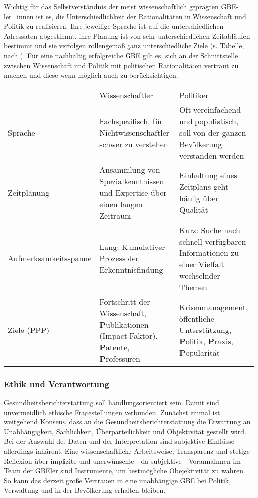 \documentclass{article}
\begin{document}
Wichtig für das Selbstverständnis der meist wissenschaftlich geprägten GBE-ler\_innen ist es, die Unterschiedlichkeit der Rationalitäten in Wissenschaft und Politik zu realisieren. Ihre jeweilige Sprache ist auf die unterschiedlichen Adressaten abgestimmt, ihre Planung ist von sehr unterschiedlichen Zeitabläufen bestimmt und sie verfolgen rollengemäß ganz unterschiedliche Ziele (s. Tabelle, nach \autocite{Kurth2006}). Für eine nachhaltig erfolgreiche GBE gilt es, sich an der Schnittstelle zwischen Wissenschaft und Politik mit politischen Rationalitäten vertraut zu machen und diese wenn möglich auch zu berücksichtigen.


\begin{tabu} to \textwidth { |X|X|X| }
\hline



 & Wissenschaftler & Politiker
 \\


Sprache & Fachspezifisch, für Nichtwissenschaftler schwer zu verstehen


 & Oft vereinfachend und populistisch, soll von der ganzen Bevölkerung verstanden werden
 \\


Zeitplanung & Ansammlung von Spezialkenntnissen und Expertise über einen langen Zeitraum & Einhaltung eines Zeitplans geht häufig über Qualität
 \\


Aufmerksamkeitsspanne & Lang: Kumulativer Prozess der Erkenntnisfindung & Kurz: Suche nach schnell verfügbaren Informationen zu einer Vielfalt wechselnder Themen
 \\


Ziele (PPP) & Fortschritt der Wissenschaft, \textbf{P}ublikationen (Impact-Faktor), \textbf{P}atente, \textbf{P}rofessuren & Krisenmanagement, öffentliche Unterstützung, \textbf{P}olitik, \textbf{P}raxis, \textbf{P}opularität
 \\
\hline

\end{tabu}

\subsubsection{\textbf{Ethik und Verantwortung}}\label{H5560507}



Gesundheitsberichterstattung soll handlungsorientiert sein. Damit sind unvermeidlich ethische Fragestellungen verbunden. Zunächst einmal ist weitgehend Konsens, dass an die Gesundheitsberichterstattung die Erwartung an Unabhängigkeit, Sachlichkeit, Überparteilichkeit und Objektivität gestellt wird. Bei der Auswahl der Daten und der Interpretation sind subjektive Einflüsse allerdings inhärent. Eine wissenschaftliche Arbeitsweise, Transparenz und stetige Reflexion über implizite und unerwünschte - da subjektive - Vorannahmen im Team der GBEler sind  Instrumente, um bestmögliche Obejektivität zu wahren.  So kann das derzeit große Vertrauen in eine unabhängige GBE bei Politik, Verwaltung und in der Bevölkerung erhalten bleiben.
\end{document}
